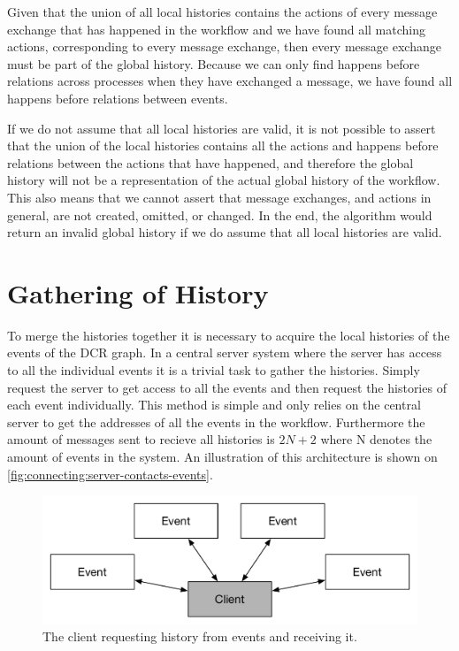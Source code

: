     \newpar Given that the union of all local histories contains the actions of every message exchange that has happened in the workflow and we have found all matching actions, corresponding to every message exchange, then every message exchange must be part of the global history. Because we can only find happens before relations across processes when they have exchanged a message, we have found all happens before relations between events.
    
    \newpar If we do not assume that all local histories are valid, it is not possible to assert that the union of the local histories contains all the actions and happens before relations between the actions that have happened, and therefore the global history will not be a representation of the actual global history of the workflow. This also means that we cannot assert that message exchanges, and actions in general, are not created, omitted, or changed. In the end, the algorithm would return an invalid global history if we do assume that all local histories are valid.
    
    
    \section{Gathering of History}
    To merge the histories together it is necessary to acquire the local histories of the events of the DCR graph. In a central server system where the server has access to all the individual events it is a trivial task to gather the histories. Simply request the server to get access to all the events and then request the histories of each event individually. This method is simple and only relies on the central server to get the addresses of all the events in the workflow. Furthermore the amount of messages sent to recieve all histories is $2N+2$ where N denotes the amount of events in the system. An illustration of this architecture is shown on \autoref{fig:connecting:server-contacts-events}.
    
    \begin{figure}[H]
    	\centering
    	\includegraphics[height=\textheight/6]{4connect/images/server-contacts-events.pdf}
    	\caption{The client requesting history from events and receiving it.}
    	\label{fig:connecting:server-contacts-events}
    \end{figure}
    
